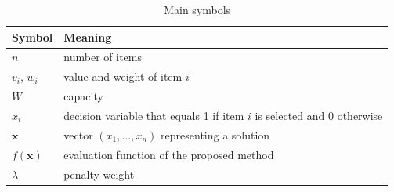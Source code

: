 \begin{table}[htbp]
  \centering
  \caption{Main symbols}
  \label{tab:notation}
  \begin{tabular}{ll}
    \toprule
    Symbol & Meaning \\
    \midrule
    $n$ & number of items \\
    $v_i$, $w_i$ & value and weight of item $i$ \\
    $W$ & capacity \\
    $x_i$ & decision variable that equals 1 if item $i$ is selected and 0 otherwise \\
    $\mathbf{x}$ & vector $(x_1, \dots, x_n)$ representing a solution \\
    $f(\mathbf{x})$ & evaluation function of the proposed method \\
    $\lambda$ & penalty weight \\
    \bottomrule
  \end{tabular}
\end{table}
